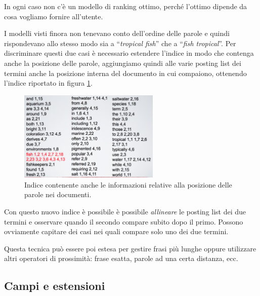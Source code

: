 



In ogni caso non c'è un modello di ranking ottimo, perché l'ottimo dipende da cosa vogliamo fornire all'utente.

I modelli visti finora non tenevano conto dell'ordine delle parole e quindi rispondevano allo stesso modo sia a ``\textit{tropical fish}'' che a ``\textit{fish tropical}''.
Per discriminare questi due casi è necessario estendere l'indice in modo che contenga anche la posizione delle parole, aggiungiamo quindi alle varie posting list dei termini anche la posizione interna del documento in cui compaiono, ottenendo l'indice riportato in figura \ref{fig:index-pos}.

\begin{figure}[htbp]
	\centering
	\includegraphics[width=0.6\textwidth]{./images/l7-indice-pos}
	\caption{Indice contenente anche le informazioni relative alla posizione delle parole nei documenti.}\label{fig:index-pos}
\end{figure}

Con questo nuovo indice è possibile è possibile \textit{allineare} le posting list dei due termini e osservare quando il secondo compare subito dopo il primo.
Possono ovviamente capitare dei casi nei quali compare solo uno dei due termini.

Questa tecnica può essere poi estesa per gestire frasi più lunghe oppure utilizzare altri operatori di prossimità: frase esatta, parole ad una certa distanza, ecc.

\subsection{Campi e estensioni}

